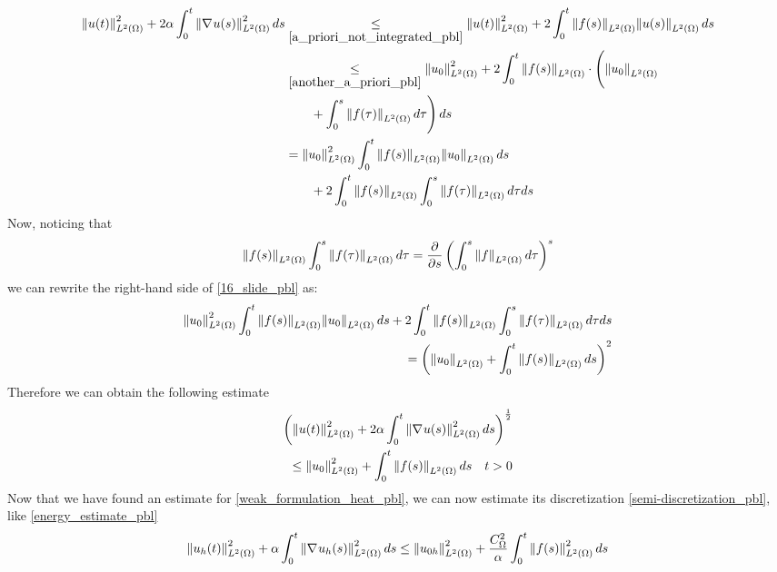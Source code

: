 \begin{equation}
    \begin{aligned}
        \norm{u(t)}_{L^2(\Omega)}^2 + 2\alpha \int_0^t \norm{\nabla\mspace{1mu} u(s)}_{L^2(\Omega)}^2 \, ds 
        &\underset{\eqref{a_priori_not_integrated_pbl}}{\leq} \norm{u(t)}_{L^2(\Omega)}^2 + 2\int_0^t \norm{f(s)}_{L^2(\Omega)}\norm{u(s)}_{L^2(\Omega)} \, ds \\
        &\underset{\eqref{another_a_priori_pbl}}{\leq} \norm{u_0}_{L^2(\Omega)}^2 + 2\int_0^t \norm{f(s)}_{L^2(\Omega)} \cdot \Bigg( \norm{u_0}_{L^2(\Omega)} \\
        &\qquad + \int_0^s \norm{f(\tau)}_{L^2(\Omega)} \, d\tau \Bigg) \, ds \\
        &= \norm{u_0}_{L^2(\Omega)}^2 \int_0^t \norm{f(s)}_{L^2(\Omega)}\norm{u_0}_{L^2(\Omega)}\, ds \\
        &\qquad+ 2 \int_0^t \norm{f(s)}_{L^2(\Omega)}\int_0^s \norm{f(\tau)}_{L^2(\Omega)} \, d\tau ds
    \end{aligned}
    \label{16_slide_pbl}
\end{equation}
Now, noticing that 
\[
    \ltwonorm{f(s)} \int_0^s \ltwonorm{f(\tau)} \, d\tau = \pderivative{s} \left( \int_0^s \ltwonorm{f} \, d\tau \right)^s
\]
we can rewrite the right-hand side of \eqref{16_slide_pbl} as:
\begin{equation*}
    \begin{split}
        \norm{u_0}_{L^2(\Omega)}^2 \int_0^t \norm{f(s)}_{L^2(\Omega)}\norm{u_0}_{L^2(\Omega)}\, ds+ 2 \int_0^t \norm{f(s)}_{L^2(\Omega)}\int_0^s \norm{f(\tau)}_{L^2(\Omega)} \, d\tau ds \\
        = \left( \norm{u_0}_{L^2(\Omega)} +\int_0^t \norm{f(s)}_{L^2(\Omega)} \, ds \right)^2
    \end{split}
\end{equation*}
Therefore we can obtain the following estimate 
\begin{equation}
    \begin{split}
        \left( \norm{u(t)}_{L^2(\Omega)}^2 + 2\alpha \int_0^t \norm{\nabla\mspace{1mu} u(s)}_{L^2(\Omega)}^2 \, ds \right)^{\frac{1}{2}} \\
        \leq \norm{u_0}_{L^2(\Omega)}^2 + \int_0^t \norm{f(s)}_{L^2(\Omega)} \, ds \quad t >0
    \end{split}
    \label{hopefully_last_estimate_pbl}
\end{equation}
Now that we have found an estimate for \eqref{weak_formulation_heat_pbl}, we can now estimate its discretization \eqref{semi-discretization_pbl}, like \eqref{energy_estimate_pbl}
\begin{equation}
    \norm{u_h(t)}_{L^2(\Omega)}^2 +\alpha \int_0^t \norm{\nabla\mspace{1mu} u_h(s)}_{L^2(\Omega)}^2 \, ds \leq \norm{u_{0h}}_{L^2(\Omega)}^2 + \frac{C_\Omega^2}{\alpha} \int_0^t \norm{f(s)}_{L^2(\Omega)}^2 \, ds
    \label{energy_est_galerkin_pbl}
\end{equation}
